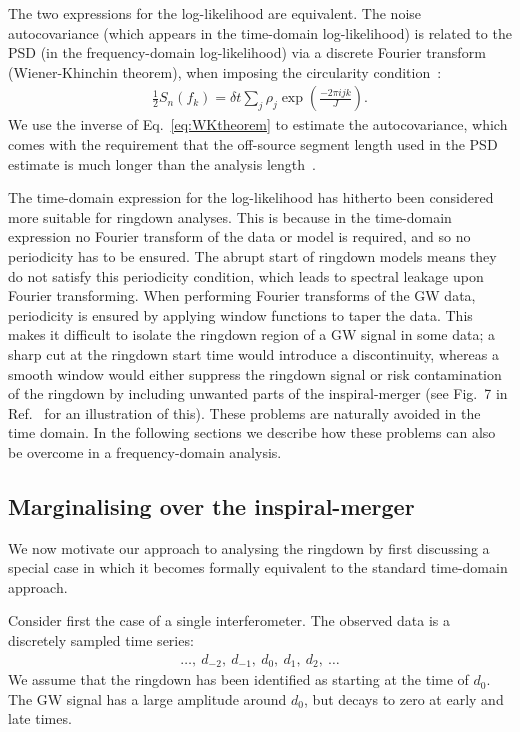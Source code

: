 The two expressions for the log-likelihood are equivalent.
The noise autocovariance (which appears in the time-domain log-likelihood) is related to the PSD (in the frequency-domain log-likelihood) via a discrete Fourier transform (Wiener-Khinchin theorem), when imposing the circularity condition~\cite{Isi:2021iql}:
\begin{align} \label{eq:WKtheorem}
	\frac{1}{2}S_n(f_k) = \delta t \sum_{j}\rho_j \exp\left(\frac{-2\pi ijk}{J}\right).
\end{align}
We use the inverse of Eq.~\ref{eq:WKtheorem} to estimate the autocovariance, which comes with the requirement that the off-source segment length used in the PSD estimate is much longer than the analysis length~\cite{Isi:2021iql}.

The time-domain expression for the log-likelihood has hitherto been considered more suitable for ringdown analyses.
This is because in the time-domain expression no Fourier transform of the data or model is required, and so no periodicity has to be ensured.
The abrupt start of ringdown models means they do not satisfy this periodicity condition, which leads to spectral leakage upon Fourier transforming. 
When performing Fourier transforms of the GW data, periodicity is ensured by applying window functions to taper the data.
This makes it difficult to isolate the ringdown region of a GW signal in some data; a sharp cut at the ringdown start time would introduce a discontinuity, whereas a smooth window would either suppress the ringdown signal or risk contamination of the ringdown by including unwanted parts of the inspiral-merger (see Fig.~7 in Ref.~\cite{Isi:2021iql} for an illustration of this). These problems are naturally avoided in the time domain. 
In the following sections we describe how these problems can also be overcome in a frequency-domain analysis.


\subsection{Marginalising over the inspiral-merger}\label{subsec:motivation}

We now motivate our approach to analysing the ringdown by first discussing a special case in which it becomes formally equivalent to the standard time-domain approach. 

Consider first the case of a single interferometer.
The observed data is a discretely sampled time series:
\begin{align}
	\ldots,\ d_{-2},\ d_{-1},\ d_{0},\ d_{1},\ d_{2},\ \ldots
\end{align}
We assume that the ringdown has been identified as starting at the time of $d_0$.
The GW signal has a large amplitude around $d_0$, but decays to zero at early and late times.

